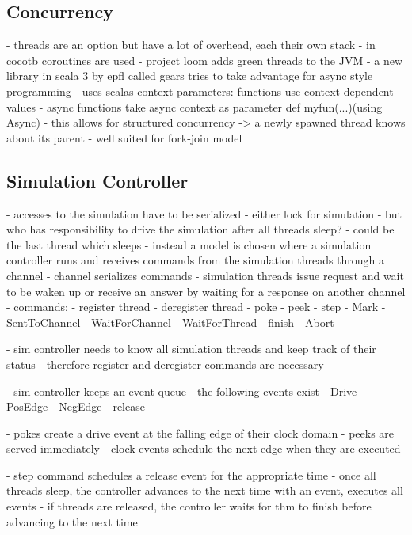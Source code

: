 \documentclass[11pt,a4paper]{report}
\begin{document}
\subsection{Concurrency} %



- threads are an option but have a lot of overhead, each their own stack
- in cocotb coroutines are used 
- project loom adds green threads to the JVM \cite{loom}
- a new library in scala 3 by epfl called gears tries to take advantage for async style programming \cite{gears}
- uses scalas context parameters: functions use context dependent values 
- async functions take async context as parameter def myfun(...)(using Async)
- this allows for structured concurrency -> a newly spawned thread knows about its parent 
- well suited for fork-join model

\subsection{Simulation Controller} %

- accesses to the simulation have to be serialized
- either lock for simulation
- but who has responsibility to drive the simulation after all threads sleep?
- could be the last thread which sleeps
- instead a model is chosen where a simulation controller runs and receives commands from the simulation threads through a channel
- channel serializes commands
- simulation threads issue request and wait to be waken up or receive an answer by waiting for a response on another channel
- commands:
  - register thread
  - deregister thread
  - poke
  - peek
  - step
  - Mark
  - SentToChannel
  - WaitForChannel
  - WaitForThread
  - finish
  - Abort

- sim controller needs to know all simulation threads and keep track of their status
- therefore register and deregister commands are necessary

- sim controller keeps an event queue
- the following events exist
  - Drive
  - PosEdge
  - NegEdge
  - release

- pokes create a drive event at the falling edge of their clock domain
- peeks are served immediately
- clock events schedule the next edge when they are executed

- step command schedules a release event for the appropriate time
- once all threads sleep, the controller advances to the next time with an event, executes all events
- if threads are released, the controller waits for thm to finish before advancing to the next time
\end{document}
